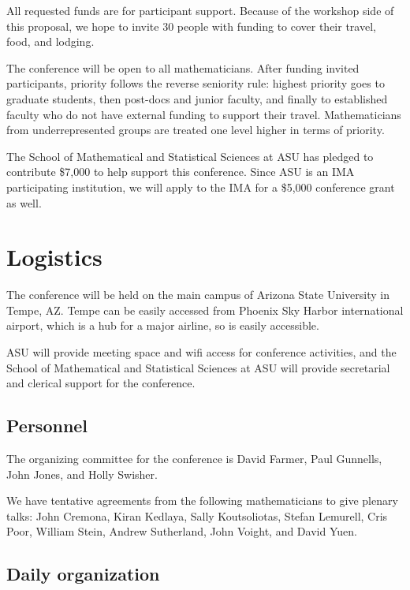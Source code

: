 \documentclass[amstex,11pt]{amsart}
\numberwithin{equation}{section}
\begin{document}
All requested funds are for participant support.  Because of the
workshop side of this proposal, we hope to invite $30$ people with
funding to cover their travel, food, and lodging.  

The conference will be open to all mathematicians.
After funding invited participants, priority 
follows the reverse seniority rule: highest priority goes to graduate
students, then post-docs and junior faculty, and finally to established
faculty who do not have external funding to support their travel.
Mathematicians from underrepresented groups are treated one level
higher in terms of priority.


The School of Mathematical and Statistical Sciences at ASU has pledged to
contribute \$7,000  to help support this conference.
Since ASU is an IMA participating institution, we will apply to the
IMA for a \$5,000 conference grant as well.

\section{Logistics}

The conference will be held on the main campus of Arizona State
University in Tempe, AZ.  Tempe can be easily accessed from Phoenix
Sky Harbor international airport, which is a hub for a major airline,
so is easily accessible.

ASU will provide meeting space and wifi access for conference
activities, and the School of Mathematical and Statistical Sciences at
ASU will provide secretarial and clerical support for the conference.

\subsection{Personnel}

The organizing committee for the conference is David
Farmer, Paul Gunnells, 
John Jones, and Holly Swisher.

We have tentative agreements from the following mathematicians to give
plenary talks:
John Cremona, Kiran Kedlaya, Sally Koutsoliotas, Stefan Lemurell, 
Cris Poor, William Stein, Andrew Sutherland, John Voight, and David Yuen.

\subsection{Daily organization}
\end{document}
